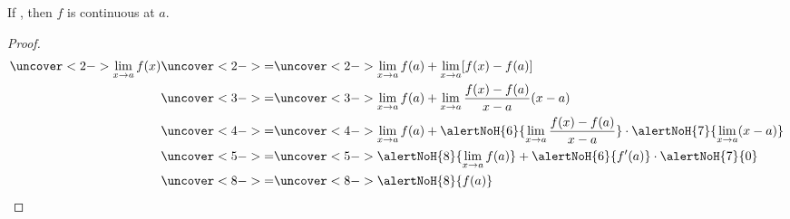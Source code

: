 \begin{frame}
\begin{theorem}
If , then $f$ is continuous at $a$.
\end{theorem}
\begin{proof}
\begin{align*}
\uncover<2->{\lim_{x\rightarrow a}f(x)}%
 &\uncover<2->{ = }  %
\uncover<2->{\lim_{x\rightarrow a}f(a) + \lim_{x\rightarrow a}[f(x) - f(a)]}\\%
 &\uncover<3->{ = }  %
\uncover<3->{\lim_{x\rightarrow a}f(a) + \lim_{x\rightarrow a}\frac{f(x) - f(a)}{x-a} (x-a)}\\%
 &\uncover<4->{ = }  %
\uncover<4->{\lim_{x\rightarrow a}f(a) + \alertNoH{ 6}{\lim_{x\rightarrow a}\frac{f(x) - f(a)}{x-a}}\cdot \alertNoH{ 7}{\lim_{x\rightarrow a}(x-a)}}\\%
 &\uncover<5->{ = }  %
\uncover<5->{\alertNoH{ 8}{\lim_{x\rightarrow a}f(a)} + \alertNoH{ 6}{f'(a)} \cdot \alertNoH{ 7}{0}}\\%
 &\uncover<8->{ = }  %
\uncover<8->{\alertNoH{ 8}{f(a)}}%
\end{align*}
%
\end{proof}
\end{frame}
